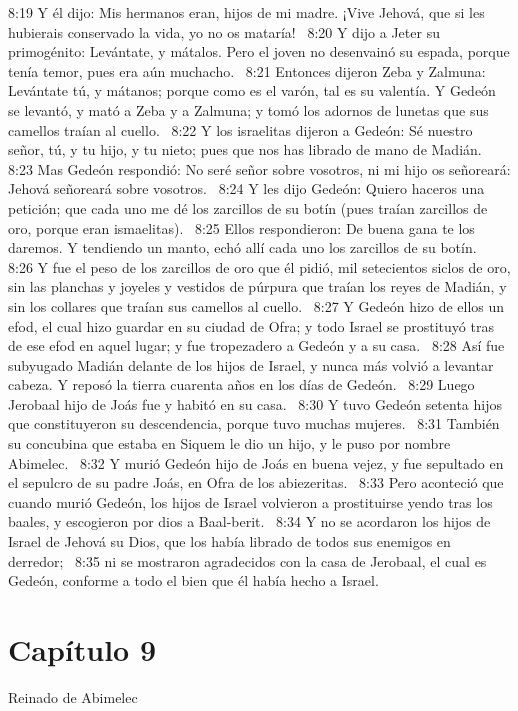 8:19 Y él dijo: Mis hermanos eran, hijos de mi madre. ¡Vive Jehová, que si les hubierais conservado la vida, yo no os mataría!  
8:20 Y dijo a Jeter su primogénito: Levántate, y mátalos. Pero el joven no desenvainó su espada, porque tenía temor, pues era aún muchacho.  
8:21 Entonces dijeron Zeba y Zalmuna: Levántate tú, y mátanos; porque como es el varón, tal es su valentía. Y Gedeón se levantó, y mató a Zeba y a Zalmuna; y tomó los adornos de lunetas que sus camellos traían al cuello.  
8:22 Y los israelitas dijeron a Gedeón: Sé nuestro señor, tú, y tu hijo, y tu nieto; pues que nos has librado de mano de Madián.  
8:23 Mas Gedeón respondió: No seré señor sobre vosotros, ni mi hijo os señoreará: Jehová señoreará sobre vosotros.  
8:24 Y les dijo Gedeón: Quiero haceros una petición; que cada uno me dé los zarcillos de su botín (pues traían zarcillos de oro, porque eran ismaelitas).  
8:25 Ellos respondieron: De buena gana te los daremos. Y tendiendo un manto, echó allí cada uno los zarcillos de su botín.  
8:26 Y fue el peso de los zarcillos de oro que él pidió, mil setecientos siclos de oro, sin las planchas y joyeles y vestidos de púrpura que traían los reyes de Madián, y sin los collares que traían sus camellos al cuello.  
8:27 Y Gedeón hizo de ellos un efod, el cual hizo guardar en su ciudad de Ofra; y todo Israel se prostituyó tras de ese efod en aquel lugar; y fue tropezadero a Gedeón y a su casa.  
8:28 Así fue subyugado Madián delante de los hijos de Israel, y nunca más volvió a levantar cabeza. Y reposó la tierra cuarenta años en los días de Gedeón.  
8:29 Luego Jerobaal hijo de Joás fue y habitó en su casa.  
8:30 Y tuvo Gedeón setenta hijos que constituyeron su descendencia, porque tuvo muchas mujeres.  
8:31 También su concubina que estaba en Siquem le dio un hijo, y le puso por nombre Abimelec.  
8:32 Y murió Gedeón hijo de Joás en buena vejez, y fue sepultado en el sepulcro de su padre Joás, en Ofra de los abiezeritas.  
8:33 Pero aconteció que cuando murió Gedeón, los hijos de Israel volvieron a prostituirse yendo tras los baales, y escogieron por dios a Baal-berit.  
8:34 Y no se acordaron los hijos de Israel de Jehová su Dios, que los había librado de todos sus enemigos en derredor;  
8:35 ni se mostraron agradecidos con la casa de Jerobaal, el cual es Gedeón, conforme a todo el bien que él había hecho a Israel.  
\section*{Capítulo 9}
Reinado de Abimelec  

